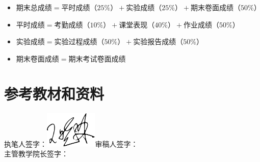 \documentclass{swfusyllabus}
\begin{document}
\begin{itemize}
\item \(期末总成绩=平时成绩（25\%）+实验成绩（25\%）+期末卷面成绩（50\%）\)
\item \(平时成绩=考勤成绩（10\%）+课堂表现（40\%）+作业成绩（50\%）\)
\item \(实验成绩 = 实验过程成绩（50\%）+ 实验报告成绩（50\%）\)
\item \(期末卷面成绩 = 期末考试卷面成绩\)
\end{itemize}

\section{参考教材和资料}


\booklist{}

\vfill
\begin{flushright}
  执笔人签字：\includegraphics[width=25mm]{wangxiaolin}\qquad 审稿人签字：\makebox[2cm][c]{}\\
  主管教学院长签字：\makebox[2cm][c]{}
\end{flushright}
\end{document}
